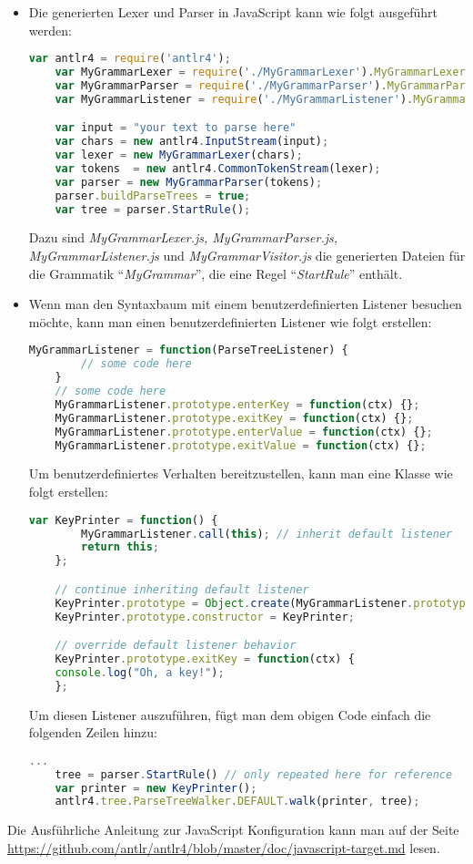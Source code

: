 \begin{itemize}
\item Die generierten  Lexer und Parser in JavaScript kann wie folgt ausgeführt werden:

\begin{lstlisting}[language=JavaScript,basicstyle=\scriptsize ]
	var antlr4 = require('antlr4');
	var MyGrammarLexer = require('./MyGrammarLexer').MyGrammarLexer;
	var MyGrammarParser = require('./MyGrammarParser').MyGrammarParser;
	var MyGrammarListener = require('./MyGrammarListener').MyGrammarListener;

	var input = "your text to parse here"
	var chars = new antlr4.InputStream(input);
	var lexer = new MyGrammarLexer(chars);
	var tokens  = new antlr4.CommonTokenStream(lexer);
	var parser = new MyGrammarParser(tokens);
	parser.buildParseTrees = true;
	var tree = parser.StartRule();
\end{lstlisting}

Dazu sind \textit{MyGrammarLexer.js, MyGrammarParser.js, MyGrammarListener.js} und \textit{MyGrammarVisitor.js} die generierten Dateien für die Grammatik  ``\textit{MyGrammar}'', die eine Regel ``\textit{StartRule}'' enthält.

\item	Wenn man den Syntaxbaum mit einem benutzerdefinierten Listener besuchen möchte, kann man einen benutzerdefinierten Listener wie folgt erstellen:

\begin{lstlisting}[language=JavaScript,basicstyle=\scriptsize]
	MyGrammarListener = function(ParseTreeListener) {
		// some code here
	}
	// some code here
	MyGrammarListener.prototype.enterKey = function(ctx) {};
	MyGrammarListener.prototype.exitKey = function(ctx) {};
	MyGrammarListener.prototype.enterValue = function(ctx) {};
	MyGrammarListener.prototype.exitValue = function(ctx) {};
\end{lstlisting}

Um benutzerdefiniertes Verhalten bereitzustellen, kann man eine Klasse wie folgt erstellen:

\begin{lstlisting}[language=JavaScript,basicstyle=\scriptsize]
	var KeyPrinter = function() {
		MyGrammarListener.call(this); // inherit default listener
		return this;
	};

	// continue inheriting default listener
	KeyPrinter.prototype = Object.create(MyGrammarListener.prototype);
	KeyPrinter.prototype.constructor = KeyPrinter;

	// override default listener behavior
	KeyPrinter.prototype.exitKey = function(ctx) {
	console.log("Oh, a key!");
	};
\end{lstlisting}

Um diesen Listener auszuführen, fügt man dem obigen Code einfach die folgenden Zeilen hinzu:

\begin{lstlisting}[language=JavaScript,basicstyle=\scriptsize]
	...
	tree = parser.StartRule() // only repeated here for reference
	var printer = new KeyPrinter();
	antlr4.tree.ParseTreeWalker.DEFAULT.walk(printer, tree);
\end{lstlisting}

\end{itemize}
Die Ausführliche Anleitung zur JavaScript Konfiguration kann man auf der Seite \url{https://github.com/antlr/antlr4/blob/master/doc/javascript-target.md} lesen. 